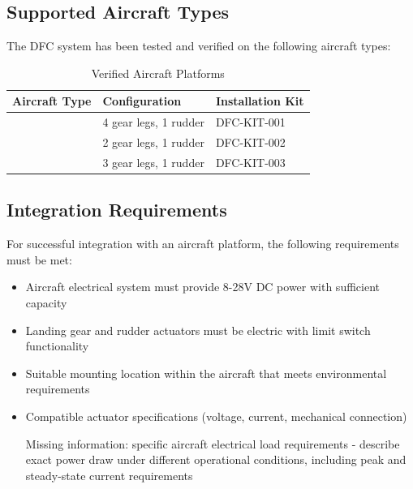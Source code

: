\documentclass[12pt,a4paper,twoside,openright]{book}
\newcommand{\tabletextfont}{\normalfont\rmfamily}
\newcommand{\tableheadfont}{\normalfont\bfseries}
\begin{document}
\subsection{Supported Aircraft Types}

The DFC system has been tested and verified on the following aircraft types:

\begin{table}[h]
\centering
\setlength{\tabcolsep}{5pt} %
\begin{tabular}{|p{}|p{}|p{}|}
\hline
\tableheadfont\textbf{Aircraft Type} & \tableheadfont\textbf{Configuration} & \tableheadfont\textbf{Installation Kit} \\
\hline
\tabletextfont [I need here: specific amphibious aircraft model] & 4 gear legs, 1 rudder & DFC-KIT-001 \\
\hline
\tabletextfont [I need here: specific amphibious aircraft model] & 2 gear legs, 1 rudder & DFC-KIT-002 \\
\hline
\tabletextfont [I need here: specific amphibious aircraft model] & 3 gear legs, 1 rudder & DFC-KIT-003 \\
\hline
\end{tabular}
\caption{Verified Aircraft Platforms}
\end{table}

\subsection{Integration Requirements}

For successful integration with an aircraft platform, the following requirements must be met:

\begin{itemize}
    \item Aircraft electrical system must provide 8-28V DC power with sufficient capacity
    \item Landing gear and rudder actuators must be electric with limit switch functionality
    \item Suitable mounting location within the aircraft that meets environmental requirements
    \item Compatible actuator specifications (voltage, current, mechanical connection)
    \item [Missing information: specific aircraft electrical load requirements - describe exact power draw under different operational conditions, including peak and steady-state current requirements]
\end{itemize}
\end{document}
